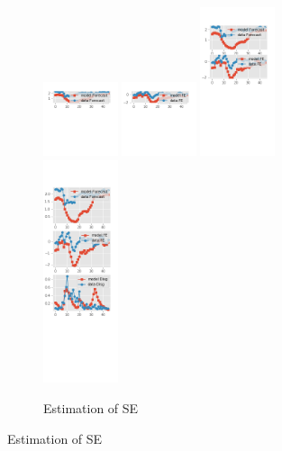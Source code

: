 \documentclass[]{article}
\begin{document}
\begin{figure}[ht]
	\centering
	\begin{subfigure}[b]{\textwidth}
		\centering
		\caption{Estimation of SE}
		\label{SE_diag_SPF}
		\includegraphics[width=0.24\textwidth]{figures/spf_se_est_diag0.png}
		\includegraphics[width=0.24\textwidth]{figures/spf_se_est_diag1.png}
		\includegraphics[width=0.24\textwidth]{figures/spf_se_est_diag2.png}
		\includegraphics[width=0.24\textwidth]{figures/spf_se_est_diag3.png}

\end{subfigure}
\end{figure}
\end{document}
